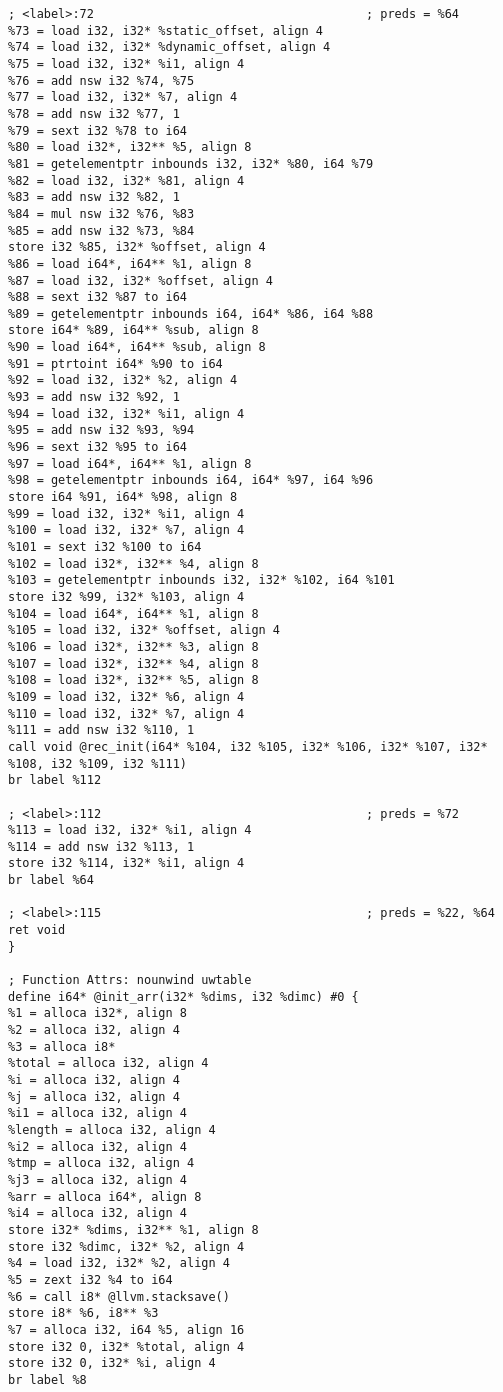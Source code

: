 \begin{verbatim}
; <label>:72                                      ; preds = %64
%73 = load i32, i32* %static_offset, align 4
%74 = load i32, i32* %dynamic_offset, align 4
%75 = load i32, i32* %i1, align 4
%76 = add nsw i32 %74, %75
%77 = load i32, i32* %7, align 4
%78 = add nsw i32 %77, 1
%79 = sext i32 %78 to i64
%80 = load i32*, i32** %5, align 8
%81 = getelementptr inbounds i32, i32* %80, i64 %79
%82 = load i32, i32* %81, align 4
%83 = add nsw i32 %82, 1
%84 = mul nsw i32 %76, %83
%85 = add nsw i32 %73, %84
store i32 %85, i32* %offset, align 4
%86 = load i64*, i64** %1, align 8
%87 = load i32, i32* %offset, align 4
%88 = sext i32 %87 to i64
%89 = getelementptr inbounds i64, i64* %86, i64 %88
store i64* %89, i64** %sub, align 8
%90 = load i64*, i64** %sub, align 8
%91 = ptrtoint i64* %90 to i64
%92 = load i32, i32* %2, align 4
%93 = add nsw i32 %92, 1
%94 = load i32, i32* %i1, align 4
%95 = add nsw i32 %93, %94
%96 = sext i32 %95 to i64
%97 = load i64*, i64** %1, align 8
%98 = getelementptr inbounds i64, i64* %97, i64 %96
store i64 %91, i64* %98, align 8
%99 = load i32, i32* %i1, align 4
%100 = load i32, i32* %7, align 4
%101 = sext i32 %100 to i64
%102 = load i32*, i32** %4, align 8
%103 = getelementptr inbounds i32, i32* %102, i64 %101
store i32 %99, i32* %103, align 4
%104 = load i64*, i64** %1, align 8
%105 = load i32, i32* %offset, align 4
%106 = load i32*, i32** %3, align 8
%107 = load i32*, i32** %4, align 8
%108 = load i32*, i32** %5, align 8
%109 = load i32, i32* %6, align 4
%110 = load i32, i32* %7, align 4
%111 = add nsw i32 %110, 1
call void @rec_init(i64* %104, i32 %105, i32* %106, i32* %107, i32* %108, i32 %109, i32 %111)
br label %112

; <label>:112                                     ; preds = %72
%113 = load i32, i32* %i1, align 4
%114 = add nsw i32 %113, 1
store i32 %114, i32* %i1, align 4
br label %64

; <label>:115                                     ; preds = %22, %64
ret void
}

; Function Attrs: nounwind uwtable
define i64* @init_arr(i32* %dims, i32 %dimc) #0 {
%1 = alloca i32*, align 8
%2 = alloca i32, align 4
%3 = alloca i8*
%total = alloca i32, align 4
%i = alloca i32, align 4
%j = alloca i32, align 4
%i1 = alloca i32, align 4
%length = alloca i32, align 4
%i2 = alloca i32, align 4
%tmp = alloca i32, align 4
%j3 = alloca i32, align 4
%arr = alloca i64*, align 8
%i4 = alloca i32, align 4
store i32* %dims, i32** %1, align 8
store i32 %dimc, i32* %2, align 4
%4 = load i32, i32* %2, align 4
%5 = zext i32 %4 to i64
%6 = call i8* @llvm.stacksave()
store i8* %6, i8** %3
%7 = alloca i32, i64 %5, align 16
store i32 0, i32* %total, align 4
store i32 0, i32* %i, align 4
br label %8


\end{verbatim}
